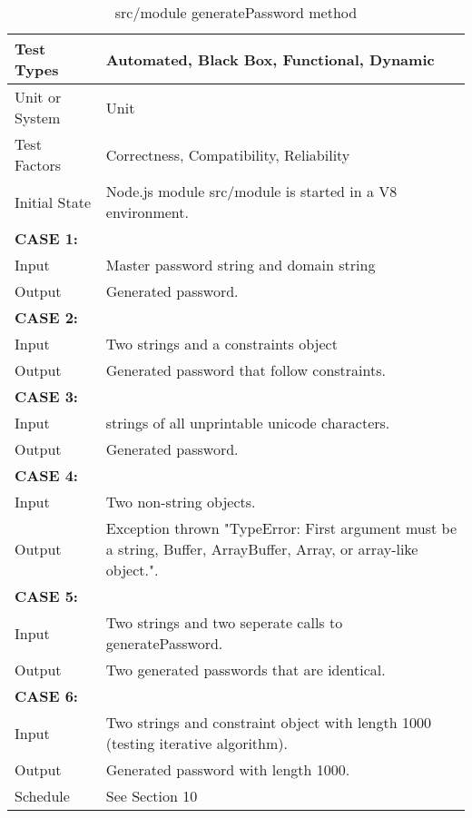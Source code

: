 \documentclass[12pt]{article}
\begin{document}
\begin{table}
\caption{src/module generatePassword method}
\begin{tabular}{|p{0.2\linewidth} || p{0.8\linewidth}|}
\hline
Test Types & Automated, Black Box, Functional, Dynamic \\
\hline
Unit or System & Unit \\
\hline
Test Factors & Correctness, Compatibility, Reliability\\
\hline
Initial State & Node.js module src/module is started in a V8 environment. \\
\hline
\hline
\textbf{CASE 1:} & \\
Input & Master password string and domain string \\
\hline
Output & Generated password. \\
\hline
\hline
\textbf{CASE 2:} & \\
Input & Two strings and a constraints object \\
\hline
Output & Generated password that follow constraints. \\
\hline
\hline
\textbf{CASE 3:} & \\
Input & strings of all unprintable unicode characters. \\
\hline
Output & Generated password. \\
\hline
\hline
\textbf{CASE 4:} & \\
Input & Two non-string objects. \\
\hline
Output & Exception thrown "TypeError: First argument must be a string, Buffer, ArrayBuffer, Array, or array-like object.". \\
\hline
\hline
\textbf{CASE 5:} & \\
Input & Two strings and two seperate calls to generatePassword. \\
\hline
Output & Two generated passwords that are identical. \\
\hline
\hline
\textbf{CASE 6:} & \\
Input & Two strings and constraint object with length 1000 (testing iterative algorithm). \\
\hline
Output & Generated password with length 1000. \\
\hline
Schedule & See Section 10 \\
\hline
\end{tabular}
\end{table}
\end{document}
